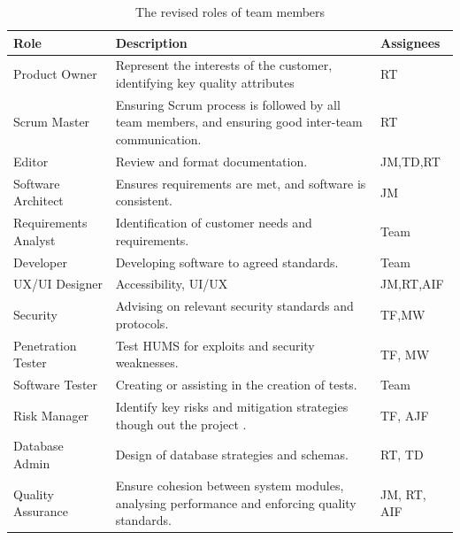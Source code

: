 \begin{table}
\begin{tabular}[H]{ | p{3.5cm} | p{8.5cm} | p{2cm} |}
\hline
\rowcolor{titleColor}\textbf{Role}
&  \textbf{Description} 
& \textbf{Assignees} \\ \hline

Product Owner & Represent the interests of the customer, identifying key quality attributes & RT \\ \hline

Scrum Master  &   Ensuring Scrum process is followed by all team members, and ensuring good inter-team communication.            		& RT           				\\ \hline
Editor  &   Review and format documentation. & JM,TD,RT \\ \hline

Software Architect  &  Ensures requirements are met, and software is consistent. & JM \\ \hline

Requirements Analyst  &   Identification of customer needs and requirements.  & Team \\ \hline

Developer &   Developing software to agreed standards. &  Team     \\ \hline

UX/UI Designer    &   Accessibility, UI/UX	& JM,RT,AIF    \\ \hline

Security    &   Advising on relevant security standards and protocols. & TF,MW  \\ \hline

Penetration Tester & Test HUMS for exploits and security weaknesses. &TF, MW \\ \hline

Software Tester &   Creating or assisting in the creation of tests. & Team  	 \\ \hline

Risk Manager &   Identify key risks and mitigation strategies though out the project .  & TF, AJF \\ \hline

Database Admin &   Design of database strategies and schemas. & RT, TD                   \\ \hline
Quality Assurance   &   Ensure cohesion between system modules, analysing performance and enforcing quality standards.  & JM, RT, AIF \\ \hline
\end{tabular}
\caption{The revised roles of team members}
\label{tab:roles}
\end{table}

